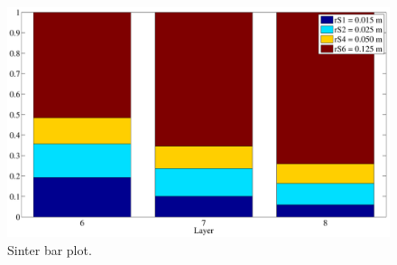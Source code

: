\begin{figure}[!htb]
\centering
\includegraphics[width=.80\columnwidth]{images/066sinterbarplot}
\caption[Sinter bar plot]{Sinter bar plot.}
\label{fig:066sinterbarplot}
\end{figure}